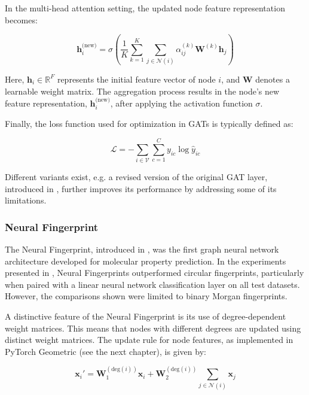 In the multi-head attention setting, the updated node feature representation becomes:

\[
\mathbf{h}_i^{\text{(new)}} = \sigma \left( \frac{1}{K} \sum_{k=1}^{K} \sum_{j \in \mathcal{N}(i)} \alpha_{ij}^{(k)} \mathbf{W}^{(k)} \mathbf{h}_j \right)
\]

Here, \( \mathbf{h}_i \in \mathbb{R}^F \) represents the initial feature vector of node \(i\), and \(\mathbf{W}\) denotes a learnable weight matrix. The aggregation process results in the node's new feature representation, \( \mathbf{h}_i^{\text{(new)}} \), after applying the activation function \( \sigma \).

Finally, the loss function used for optimization in GATs is typically defined as:

\[
\mathcal{L} = - \sum_{i \in \mathcal{V}} \sum_{c=1}^{C} y_{ic} \log \hat{y}_{ic}
\]

Different variants exist, e.g. a revised version of the original GAT layer, introduced in \cite{Brody.30.05.2021b}, further improves its performance by addressing some of its limitations.






\subsubsection{Neural Fingerprint}



The Neural Fingerprint, introduced in \cite{Duvenaud.30.09.2015}, was the first graph neural network architecture developed for molecular property prediction. In the experiments presented in \cite{Duvenaud.30.09.2015}, Neural Fingerprints outperformed circular fingerprints, particularly when paired with a linear neural network classification layer on all test datasets. However, the comparisons shown were limited to binary Morgan fingerprints.

A distinctive feature of the Neural Fingerprint is its use of degree-dependent weight matrices. This means that nodes with different degrees are updated using distinct weight matrices. The update rule for node features, as implemented in PyTorch Geometric (see the next chapter), is given by:

\begin{equation}
\mathbf{x}_i' = \mathbf{W}_1^{(\text{deg}(i))} \mathbf{x}_i + \mathbf{W}_2^{(\text{deg}(i))} \sum_{j \in \mathcal{N}(i)} \mathbf{x}_j
\end{equation}



